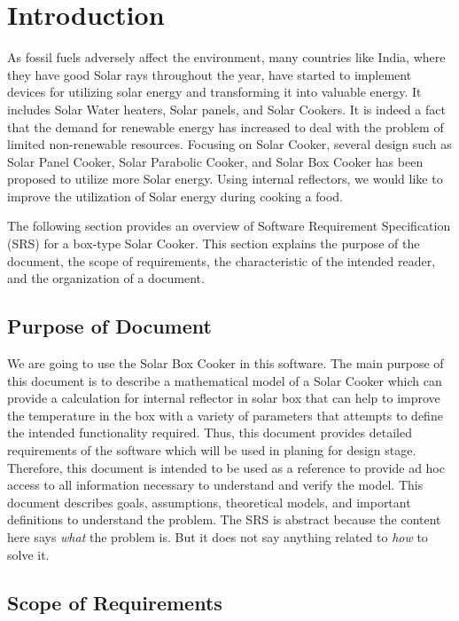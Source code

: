 \documentclass[12pt]{article}
\begin{document}
\newpage


\section{Introduction}

As fossil fuels adversely affect the environment, many countries like India, where they have good Solar rays throughout the year, have started to implement devices for utilizing solar energy and transforming it into valuable energy. It includes Solar Water heaters, Solar panels, and Solar Cookers. It is indeed a fact that the demand for renewable energy has increased to deal with the problem of limited non-renewable resources. Focusing on Solar Cooker, several design such as Solar Panel Cooker, Solar Parabolic Cooker, and Solar Box Cooker has been proposed to utilize more Solar energy. Using internal reflectors, we would like to improve the utilization of Solar energy during cooking a food.   

The following section provides an overview of Software Requirement Specification (SRS) for a box-type Solar Cooker. This section explains the purpose of the document, the scope of requirements, the characteristic of the intended reader, and the organization of a document.   


\subsection{Purpose of Document}

We are going to use the Solar Box Cooker in this software. The main purpose of this document is to describe a mathematical model of a Solar Cooker which can provide a calculation for internal reflector in solar box that can help to improve the temperature in the box with a variety of parameters that attempts to define the intended functionality required. Thus, this document provides detailed requirements of the software which will be used in planing for design stage. Therefore, this document is intended to be used as a reference to provide ad hoc access to all information necessary to understand and verify the model. This document describes goals, assumptions, theoretical models, and important definitions to understand the problem. The SRS is abstract because the content here says \emph{what} the problem is. But it does not say anything related to \emph{how} to solve it.

\subsection{Scope of Requirements} 
\end{document}
